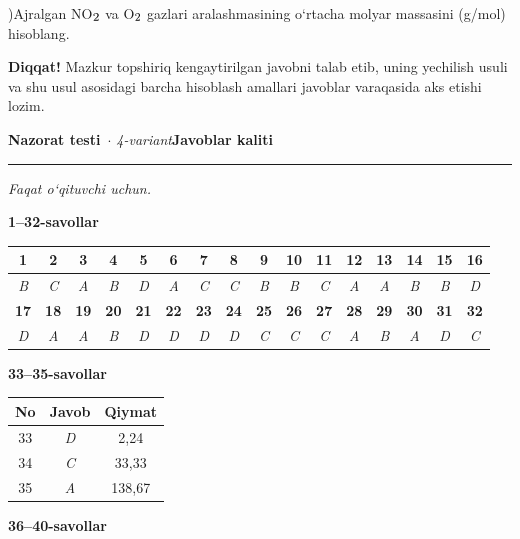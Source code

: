 \documentclass[11pt,a4paper]{article}
\renewcommand{\textsubscript}[1]{\ensuremath{_{\text{\fontsize{8}{8}\selectfont #1}}}}
\newcommand{\qsep}{\par\vspace{1pt}\noindent\rule{0pt}{0.4pt}\par\vspace{5pt}}
\newcommand{\diqqat}[1]{\par\smallskip\noindent\textbf{Diqqat!} #1\par\medskip}
\begin{document}
)Ajralgan NO\textsubscript{2} va O\textsubscript{2} gazlari aralashmasining o`rtacha molyar massasini (g/mol) hisoblang.\par
\diqqat{Mazkur topshiriq kengaytirilgan javobni talab etib, uning yechilish usuli va shu usul asosidagi barcha hisoblash amallari javoblar varaqasida aks etishi lozim.}\qsep
\newpage
\noindent\textbf{\fontsize{13}{15}\selectfont Nazorat testi}\ \textit{$\cdot$ 4-variant}\hfill \textbf{Javoblar kaliti}\par\smallskip\hrule\smallskip
\textit{Faqat o`qituvchi uchun.}\par\medskip
\noindent\textbf{1--32-savollar}\par\smallskip
\noindent\begin{tabular}{|c|c|c|c|c|c|c|c|c|c|c|c|c|c|c|c|}\hline
\textbf{1} & \textbf{2} & \textbf{3} & \textbf{4} & \textbf{5} & \textbf{6} & \textbf{7} & \textbf{8} & \textbf{9} & \textbf{10} & \textbf{11} & \textbf{12} & \textbf{13} & \textbf{14} & \textbf{15} & \textbf{16}\\\hline
\textsl{B} & \textsl{C} & \textsl{A} & \textsl{B} & \textsl{D} & \textsl{A} & \textsl{C} & \textsl{C} & \textsl{B} & \textsl{B} & \textsl{C} & \textsl{A} & \textsl{A} & \textsl{B} & \textsl{B} & \textsl{D}\\\hline
\textbf{17} & \textbf{18} & \textbf{19} & \textbf{20} & \textbf{21} & \textbf{22} & \textbf{23} & \textbf{24} & \textbf{25} & \textbf{26} & \textbf{27} & \textbf{28} & \textbf{29} & \textbf{30} & \textbf{31} & \textbf{32}\\\hline
\textsl{D} & \textsl{A} & \textsl{A} & \textsl{B} & \textsl{D} & \textsl{D} & \textsl{D} & \textsl{D} & \textsl{C} & \textsl{C} & \textsl{C} & \textsl{A} & \textsl{B} & \textsl{A} & \textsl{D} & \textsl{C}\\\hline
\end{tabular}\par\medskip
\noindent\textbf{33--35-savollar}\par\smallskip
\noindent\begin{tabular}{|c|c|c|}\hline \textbf{No} & \textbf{Javob} & \textbf{Qiymat}\\\hline
33 & \textsl{D} & 2,24\\\hline
34 & \textsl{C} & 33,33\\\hline
35 & \textsl{A} & 138,67\\\hline
\end{tabular}\par\medskip
\noindent\textbf{36--40-savollar}\par\smallskip
\end{document}
